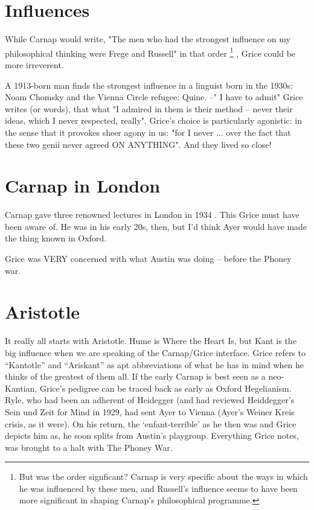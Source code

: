 \documentclass[10pt,titlepage]{book}
\begin{document}
\section{Influences}

While Carnap would write, "The men who had the strongest  influence on my 
philosophical thinking were Frege and Russell" in that order%
\footnote{But was the order signficant?
Carnap is very specific about the ways in which he was influenced by these men, and Russell's influence seems to have been more significant in shaping Carnap's philosophical programme.}%
,  Grice could be 
more irreverent.

A 1913-born man finds the strongest influence in  a 
linguist born in the 1930s: Noam Chomsky and the Vienna Circle refugee: Quine.  --"
I have to admit" Grice writes (or words), that what "I admired in them is  
their method -- never their ideas, which I never respected, really". Grice's 
 choice is particularly agonistic: in the sense that it provokes sheer 
agony in  us: "for I never ... over the fact that these two genii never agreed 
ON  ANYTHING".
And they lived so close!

\section{Carnap in London}

Carnap gave three renowned lectures in London in 1934 \cite{carnap35}.
This  Grice must have been aware of. He was in his early 
20s, then, but I’d think Ayer  would have made the thing known in Oxford.
 
Grice was VERY concerned with what Austin was doing -- before the Phoney war.

\section{Aristotle}

It really all starts with Aristotle.
Hume is Where the Heart Is, but Kant is the big influence when we are speaking of the Carnap/Grice interface. 
Grice refers to “Kantotle” and “Ariskant” as apt abbreviations of what he has in mind when he thinks of the greatest of them all.
If the early Carnap is best seen as a neo-Kantian, Grice’s pedigree can be traced back as early as Oxford Hegelianism.
Ryle, who had been an adherent of  Heidegger (and had reviewed Heiddegger’s Sein und Zeit for Mind in 1929, had sent Ayer to Vienna (Ayer’s Weiner Kreis 
crisis, as it were). On his return, the  ‘enfant-terrible’ as he then was and Grice depicts him as, he soon splits from  Austin's playgroup.
Everything Grice notes, was brought to a halt with The Phoney War.
\end{document}

